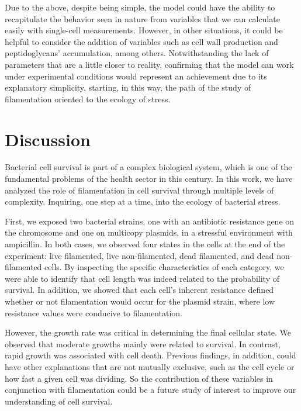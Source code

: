 \documentclass[
  12pt,
  a4paper,
  oneside]{krantz}
\begin{document}
Due to the above, despite being simple, the model could have the ability
to recapitulate the behavior seen in nature from variables that we can
calculate easily with single-cell measurements. However, in other
situations, it could be helpful to consider the addition of variables
such as cell wall production and peptidoglycans' accumulation, among
others. Notwithstanding the lack of parameters that are a little closer
to reality, confirming that the model can work under experimental
conditions would represent an achievement due to its explanatory
simplicity, starting, in this way, the path of the study of
filamentation oriented to the ecology of stress.

\hypertarget{general-discussion}{%
\chapter{Discussion}\label{general-discussion}}

Bacterial cell survival is part of a complex biological system, which is
one of the fundamental problems of the health sector in this century. In
this work, we have analyzed the role of filamentation in cell survival
through multiple levels of complexity. Inquiring, one step at a time,
into the ecology of bacterial stress.

First, we exposed two bacterial strains, one with an antibiotic
resistance gene on the chromosome and one on multicopy plasmids, in a
stressful environment with ampicillin. In both cases, we observed four
states in the cells at the end of the experiment: live filamented, live
non-filamented, dead filamented, and dead non-filamented cells. By
inspecting the specific characteristics of each category, we were able
to identify that cell length was indeed related to the probability of
survival. In addition, we showed that each cell's inherent resistance
defined whether or not filamentation would occur for the plasmid strain,
where low resistance values were conducive to filamentation.

However, the growth rate was critical in determining the final cellular
state. We observed that moderate growths mainly were related to
survival. In contrast, rapid growth was associated with cell death.
Previous findings, in addition, could have other explanations that are
not mutually exclusive, such as the cell cycle or how fast a given cell
was dividing. So the contribution of these variables in conjunction with
filamentation could be a future study of interest to improve our
understanding of cell survival.
\end{document}
